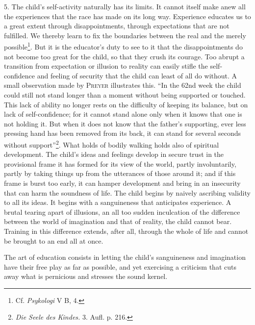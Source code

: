 \documentclass[12pt,a4paper,openany]{book}
\newcommand{\opage}[1]{\marginnote{\footnotesize\textit{[#1]}}}
\begin{document}
5. The child's self-activity naturally has its limits. It cannot itself make anew all the experiences that the race has
made on its long way. Experience educates us to a great extent through disappointments, through expectations that are
not fulfilled. We thereby learn to fix the boundaries between the real and the merely possible\footnote[1]{Cf.
\textit{Psykologi} V B, 4.}. But it is the educator's duty to see to it that the disappointments do not become too
great for the child, so that they crush its courage. Too abrupt a transition from expectation or illusion to reality can
easily stifle the self-confidence and feeling of security that the child can least of all do without. A small
observation made by \textsc{Preyer} illustrates this. ``In the 62nd week the child could still not stand longer than a
moment without being supported or touched. This lack of ability no longer rests on the difficulty of keeping its balance,
but on lack of self-confidence; for it cannot stand alone only when it knows that one is not holding it. But when it does
not know that the father's supporting, ever less pressing hand has been removed from its back, it can stand for several
seconds without support''\footnote[2]{\textit{Die Seele des Kindes.} 3. Aufl. p. 216.}.%
What holds of bodily walking holds also of spiritual development. The child's ideas and feelings develop in secure trust
in the provisional frame it has formed for its view of the world, partly involuntarily, partly by taking things up from
the utterances of those around it; and if this frame is burst too early, it can hamper development and bring in an
insecurity that can harm the soundness of life. The child begins by naively ascribing validity to all its ideas. It
begins with a sanguineness that anticipates experience. A brutal tearing apart of illusions, an all too sudden
inculcation of the difference between the world of imagination and that of reality, the child cannot bear. Training in
this
\opage{336}difference extends, after all, through the whole of life and cannot be brought to an end all at once.

The art of education consists in letting the child's sanguineness and imagination have their free play as far as
possible, and yet exercising a criticism that cuts away what is pernicious and stresses the sound kernel.
\end{document}

